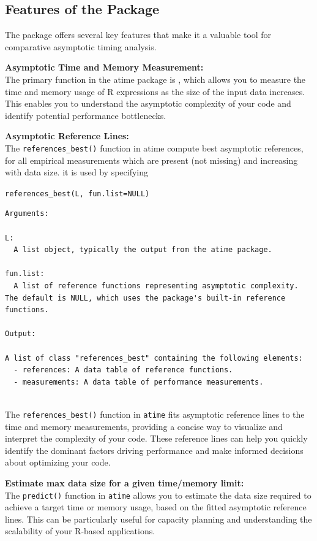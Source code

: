 \subsection{Features of the Package}
The package offers several key features that make it a valuable tool for comparative asymptotic timing analysis.

\textbf{Asymptotic Time and Memory Measurement:} \\
The primary function in the atime package is , which allows you to measure the time and memory usage of R expressions as the size of the input data increases. This enables you to understand the asymptotic complexity of your code and identify potential performance bottlenecks.
\vspace{0.1in}

\textbf{Asymptotic Reference Lines:} \\

The \texttt{references\_best()} function in atime compute best asymptotic references, for all empirical measurements which are present (not missing) and increasing with data size. it is used by specifying

\texttt{references\_best(L, fun.list=NULL)}


\begin{lstlisting}
Arguments:

L: 
  A list object, typically the output from the atime package.

fun.list: 
  A list of reference functions representing asymptotic complexity. The default is NULL, which uses the package's built-in reference functions.

Output:

A list of class "references_best" containing the following elements:
  - references: A data table of reference functions.
  - measurements: A data table of performance measurements.
  
\end{lstlisting}


The \texttt{references\_best()} function in \texttt{atime} fits asymptotic reference lines to the time and memory measurements, providing a concise way to visualize and interpret the complexity of your code. These reference lines can help you quickly identify the dominant factors driving performance and make informed decisions about optimizing your code.
\vspace{0.1in}


\textbf{Estimate max data size for a given time/memory limit:} \\
The \texttt{predict()} function in \texttt{atime} allows you to estimate the data size required to achieve a target time or memory usage, based on the fitted asymptotic reference lines. This can be particularly useful for capacity planning and understanding the scalability of your R-based applications.
\vspace{0.1in}


